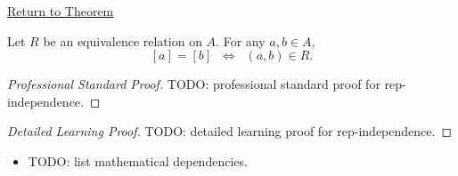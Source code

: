 \newpage
{}
\label{prf:rep-independence}

\begin{remark*}[Return]
\hyperref[lem:rep-independence]{Return to Theorem}
\end{remark*}

\begin{lemma*}
Let $R$ be an equivalence relation on $A$. For any $a,b \in A$,
\[
[a] = [b]
\;\;\Longleftrightarrow\;\;
(a,b) \in R.
\]
\end{lemma*}

\begin{proof}[Professional Standard Proof]
\LRAProofBodyStart
TODO: professional standard proof for rep-independence.
\end{proof}

\begin{proof}[Detailed Learning Proof]
\LRAProofBodyStart
TODO: detailed learning proof for rep-independence.
\end{proof}

\begin{remark*}
\end{remark*}

\begin{dependencies}
\begin{itemize}
  \item TODO: list mathematical dependencies.
\end{itemize}
\end{dependencies}

\clearpage
